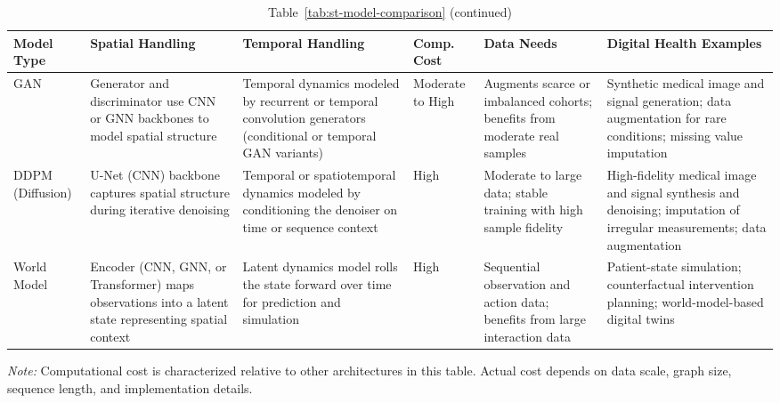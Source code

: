 \documentclass[acmsmall]{acmart}
\begin{document}
\begin{table}[htbp]
\centering
\caption*{Table~\ref{tab:st-model-comparison} (continued)}
\small
\renewcommand{\arraystretch}{1.35}
\begin{tabularx}{\textwidth}{>{\raggedright\arraybackslash}p{2.2cm} >{\raggedright\arraybackslash}p{2.5cm} >{\raggedright\arraybackslash}p{2.5cm} >{\raggedright\arraybackslash}p{1.4cm} >{\raggedright\arraybackslash}p{1.8cm} >{\raggedright\arraybackslash}X}
\toprule
\textbf{Model Type} & \textbf{Spatial Handling} & \textbf{Temporal Handling} & \textbf{Comp. Cost} & \textbf{Data Needs} & \textbf{Digital Health Examples} \\
\midrule

GAN
& Generator and discriminator use CNN or GNN backbones to model spatial structure
& Temporal dynamics modeled by recurrent or temporal convolution generators (conditional or temporal GAN variants)
& Moderate to High
& Augments scarce or imbalanced cohorts; benefits from moderate real samples
& Synthetic medical image and signal generation; data augmentation for rare conditions; missing value imputation \\

\addlinespace[4pt]

DDPM (Diffusion)
& U-Net (CNN) backbone captures spatial structure during iterative denoising
& Temporal or spatiotemporal dynamics modeled by conditioning the denoiser on time or sequence context
& High
& Moderate to large data; stable training with high sample fidelity
& High-fidelity medical image and signal synthesis and denoising; imputation of irregular measurements; data augmentation \\

\addlinespace[4pt]

World Model
& Encoder (CNN, GNN, or Transformer) maps observations into a latent state representing spatial context
& Latent dynamics model rolls the state forward over time for prediction and simulation
& High
& Sequential observation and action data; benefits from large interaction data
& Patient-state simulation; counterfactual intervention planning; world-model-based digital twins \\
\bottomrule
\end{tabularx}
\vspace{4pt}
{\footnotesize \textit{Note:} Computational cost is characterized relative to other architectures in this table. Actual cost depends on data scale, graph size, sequence length, and implementation details.}
\end{table}
 
\end{document}
